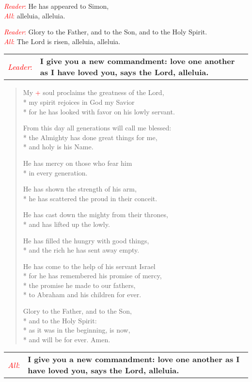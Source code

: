 \documentclass[letterpaper,14pt]{extarticle}
\newcommand{\side}[1]{\flagverse{\textcolor{red}{\textit{#1}}:}}
\newcommand{\sidestar}[1]{\textcolor{red}{\textit{#1}:}}
\newcommand{\rednote}[1]{\textcolor{red}{#1}}
\newcommand{\antiphon}[2]{
	\begin{tabular}[h]{r p{4.25in}}
		\sidestar{#1} & \textbf{#2}
	\end{tabular}}
\begin{document}
\sidestar{Reader} He has appeared to Simon, \\
\sidestar{All} alleluia, alleluia.

\sidestar{Reader} Glory to the Father, and to the Son, and to the Holy Spirit. \\
\sidestar{All} The Lord is risen, alleluia, alleluia.

\antiphon{Leader}{I give you a new commandment: love one another as I have loved
you, says the Lord, alleluia.}
\begin{verse}
\side{All} My \rednote{+} soul proclaims the greatness of the Lord, \\*
my spirit rejoices in God my Savior \\*
for he has looked with favor on his lowly servant.

From this day all generations will call me blessed: \\*
the Almighty has done great things for me, \\*
and holy is his Name.

He has mercy on those who fear him \\*
in every generation.

He has shown the strength of his arm, \\*
he has scattered the proud in their conceit.

He has cast down the mighty from their thrones, \\*
and has lifted up the lowly.

He has filled the hungry with good things, \\*
and the rich he has sent away empty.

He has come to the help of his servant Israel \\*
for he has remembered his promise of mercy, \\*
the promise he made to our fathers, \\*
to Abraham and his children for ever.

Glory to the Father, and to the Son, \\*
and to the Holy Spirit: \\*
as it was in the beginning, is now, \\*
and will be for ever. Amen.
\end{verse}
\antiphon{All}{I give you a new commandment: love one another as I have loved
you, says the Lord, alleluia.}
\end{document}
